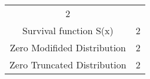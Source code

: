 \documentclass[]{book}
\theoremstyle{definition}
\theoremstyle{definition}
\theoremstyle{definition}
\theoremstyle{remark}
\begin{document}
\begin{longtable}[]{@{}cc@{}}
\begin{minipage}[t]{0.30\columnwidth}
2\strut
\end{minipage}\tabularnewline
\begin{minipage}[t]{0.43\columnwidth}\centering\strut
Survival function S(x)\strut
\end{minipage} & \begin{minipage}[t]{0.30\columnwidth}\centering\strut
2\strut
\end{minipage}\tabularnewline
\begin{minipage}[t]{0.43\columnwidth}\centering\strut
Zero Modifided Distribution\strut
\end{minipage} & \begin{minipage}[t]{0.30\columnwidth}\centering\strut
2\strut
\end{minipage}\tabularnewline
\begin{minipage}[t]{0.43\columnwidth}\centering\strut
Zero Truncated Distribution\strut
\end{minipage} & \begin{minipage}[t]{0.30\columnwidth}\centering\strut
2\strut
\end{minipage}\tabularnewline
\bottomrule
\end{longtable}


\end{document}
